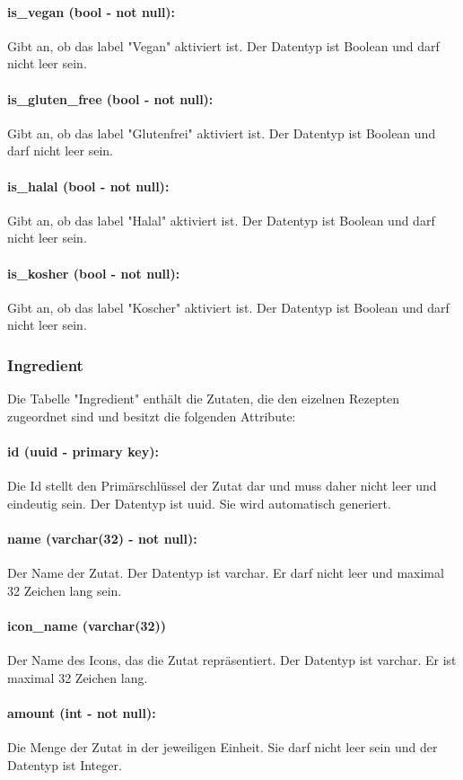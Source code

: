 \documentclass[parskip=full]{scrartcl}
\begin{document}
\paragraph{is\_vegan (bool - not null):} Gibt an, ob das \Gls{label} "Vegan" aktiviert ist. Der Datentyp ist Boolean und darf nicht leer sein.
\paragraph{is\_gluten\_free (bool - not null):} Gibt an, ob das \Gls{label} "Glutenfrei" aktiviert ist. Der Datentyp ist Boolean und darf nicht leer sein.
\paragraph{is\_halal (bool - not null):} Gibt an, ob das \Gls{label} "Halal" aktiviert ist. Der Datentyp ist Boolean und darf nicht leer sein.
\paragraph{is\_kosher (bool - not null):} Gibt an, ob das \Gls{label} "Koscher" aktiviert ist. Der Datentyp ist Boolean und darf nicht leer sein.
\newpage
\subsubsection{Ingredient}
Die Tabelle "Ingredient" enthält die Zutaten, die den eizelnen Rezepten zugeordnet sind und besitzt die folgenden Attribute:
\paragraph{id (uuid - primary key):} Die Id stellt den Primärschlüssel der Zutat dar und muss daher nicht leer und eindeutig sein. Der Datentyp ist \Gls{uuid}. Sie wird automatisch generiert.
\paragraph{name (varchar(32) - not null):} Der Name der Zutat. Der Datentyp ist \Gls{varchar}. Er darf nicht leer und maximal 32 Zeichen lang sein.
\paragraph{icon\_name (varchar(32))} Der Name des Icons, das die Zutat repräsentiert. Der Datentyp ist \Gls{varchar}. Er ist maximal 32 Zeichen lang.
\paragraph{amount (int - not null):} Die Menge der Zutat in der jeweiligen Einheit. Sie darf nicht leer sein und der Datentyp ist Integer.
\end{document}
